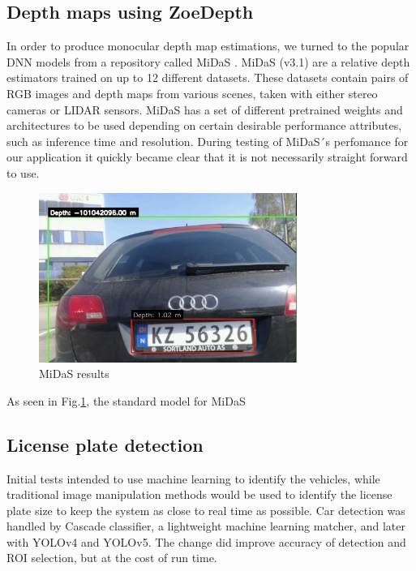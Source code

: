 \documentclass[12pt]{article}
\begin{document}
\subsection{Depth maps using ZoeDepth}
In order to produce monocular depth map estimations, we turned to the popular DNN models from a repository called MiDaS \cite{ranftl2020robust}. MiDaS (v3.1) are a relative depth estimators trained on up to 12 different datasets. These datasets contain pairs of RGB images and depth maps from various scenes, taken with either stereo cameras or LIDAR sensors. MiDaS has a set of different pretrained weights and architectures to be used depending on certain desirable performance attributes, such as inference time and resolution. During testing of MiDaS´s perfomance for our application it quickly became clear that it is not necessarily straight forward to use.

\begin{figure}
    \centering
    \includegraphics[width = 0.75\textwidth]{Figures/midas_problem.png}
    \caption{MiDaS results}
    \label{fig:midasProb}
\end{figure}

As seen in Fig.\ref{fig:midasProb}, the standard model for MiDaS

\subsection{License plate detection}
Initial tests intended to use machine learning to identify the vehicles, while traditional image manipulation methods would be used to identify the license plate size to keep the system as close to real time as possible. Car detection was handled by Cascade classifier, a lightweight machine learning matcher, and later with YOLOv4 and YOLOv5. The change did improve accuracy of detection and ROI selection, but at the cost of run time. \\
\end{document}
